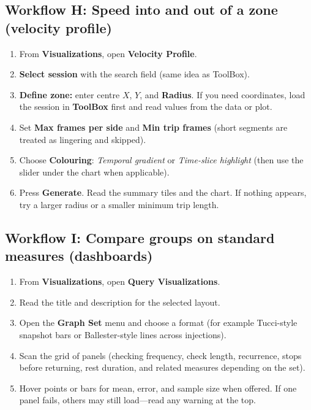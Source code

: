 \documentclass{article}
\begin{document}
\subsection{Workflow H: Speed into and out of a zone (velocity profile)}
\label{wf:velocity}

\begin{enumerate}
  \item From \textbf{Visualizations}, open \textbf{Velocity Profile}.
  \item \textbf{Select session} with the search field (same idea as ToolBox).
  \item \textbf{Define zone:} enter centre $X$, $Y$, and \textbf{Radius}. If you need coordinates, load the session in \textbf{ToolBox} first and read values from the data or plot.
  \item Set \textbf{Max frames per side} and \textbf{Min trip frames} (short segments are treated as lingering and skipped).
  \item Choose \textbf{Colouring}: \emph{Temporal gradient} or \emph{Time-slice highlight} (then use the slider under the chart when applicable).
  \item Press \textbf{Generate}. Read the summary tiles and the chart. If nothing appears, try a larger radius or a smaller minimum trip length.
\end{enumerate}

\subsection{Workflow I: Compare groups on standard measures (dashboards)}
\label{wf:dashboard}

\begin{enumerate}
  \item From \textbf{Visualizations}, open \textbf{Query Visualizations}.
  \item Read the title and description for the selected layout.
  \item Open the \textbf{Graph Set} menu and choose a format (for example Tucci-style snapshot bars or Ballester-style lines across injections).
  \item Scan the grid of panels (checking frequency, check length, recurrence, stops before returning, rest duration, and related measures depending on the set).
  \item Hover points or bars for mean, error, and sample size when offered. If one panel fails, others may still load---read any warning at the top.
\end{enumerate}
\end{document}
